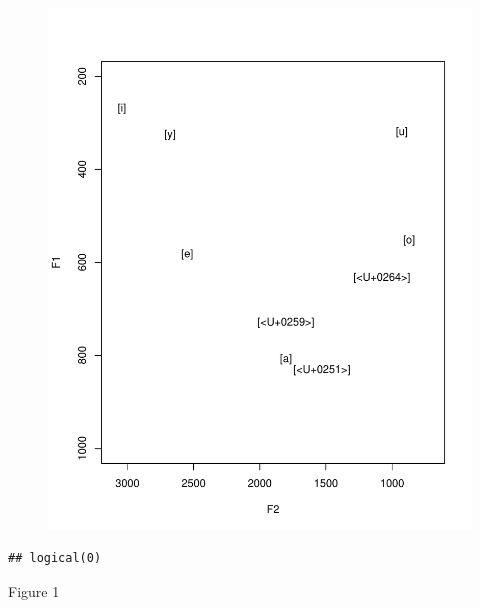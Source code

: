 \documentclass[man, fleqn, noextraspace]{apa6}
\begin{document}
\begin{figure}
\centering
\includegraphics{Vowel_v2_files/figure-latex/figure1-1.pdf}
\caption{}
\end{figure}

\begin{verbatim}
## logical(0)
\end{verbatim}

Figure 1
\end{document}
